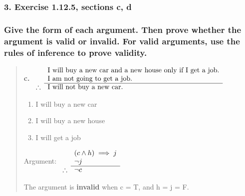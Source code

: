 \documentclass[11pt, oneside]{article}
\begin{document}
\pagebreak

\subsubsection*{3. Exercise 1.12.5, sections c, d}

\subsubsection*{Give the form of each argument. Then prove whether the argument is valid or invalid. For valid arguments, use the rules of inference to prove validity.}

\begin{quote}
    \textbf{c. }
    \(
    \begin{array}{rl}
      & \textnormal{I will buy a new car and a new house only if I get a job.} \\
      & \textnormal{I am not going to get a job.} \\
      \cline{2-2}
    \therefore & \textnormal{I will not buy a new car.} 
    \end{array}
    \)  
    
    \begin{enumerate}
        \item[c:] I will buy a new car
        \item[h:] I will buy a new house
        \item[j:] I will get a job
    \end{enumerate}
    
    Argument:
    \(
    \begin{array}{rl}
      & (c \land h) \implies j \\
      & \neg j \\
      \cline{2-2}
    \therefore & \neg c  
    \end{array}
    \)  
    
    The argument is \textbf{invalid} when c = T, and h = j = F.
\end{quote}
\end{document}
